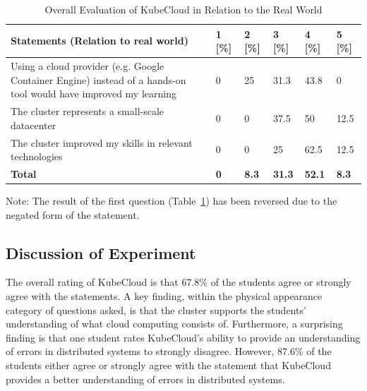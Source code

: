 \begin{table}[H]
\centering
\begin{tabular}{|p{9cm}|p{0.8cm}|p{0.8cm}|p{0.8cm}|p{0.8cm}|p{0.8cm}|}
\hline
\rowcolor[HTML]{EFEFEF} 
\textbf{Statements (Relation to real world)}             & \textbf{1} [\%] & \textbf{2} [\%] & \textbf{3} [\%] & \textbf{4} [\%] & \textbf{5} [\%]   \\ \hline
Using a cloud provider (e.g. Google Container Engine) instead of a hands-on tool would have improved my learning		 & 0 & 25 & 31.3 & 43.8  & 0	 	\\ \hline
The cluster represents a small-scale datacenter		& 0 & 0 & 37.5 & 50 & 12.5 	\\ \hline
The cluster improved my skills in relevant technologies		& 0 & 0 & 25 & 62.5 & 12.5 	 	\\ \hline
\rowcolor[HTML]{EFEFEF} 
\textbf{Total}             	& \textbf{0} & \textbf{8.3} & \textbf{31.3} & \textbf{52.1} & \textbf{8.3}   \\ \hline
\end{tabular}
\caption{Overall Evaluation of KubeCloud in Relation to the Real World}
\label{table:overallevaluationclusterrealworld}
\end{table}

\noindent
Note: The result of the first question (Table~\ref{table:overallevaluationclusterrealworld}) has been reversed due to the negated form of the statement.
\renewcommand*{\arraystretch}{1.8}

\subsection*{Discussion of Experiment}
The overall rating of KubeCloud is that 67.8\% of the students agree or strongly agree with the statements. A key finding, within the physical appearance category of questions asked, is that the cluster supports the students' understanding of what cloud computing consists of. Furthermore, a surprising finding is that one student rates KubeCloud's ability to provide an understanding of errors in distributed systems to strongly disagree. However, 87.6\% of the students either agree or strongly agree with the statement that KubeCloud provides a better understanding of errors in distributed systems. \\

